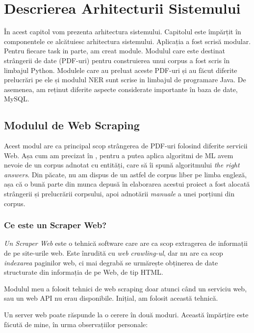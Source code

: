 \chapter{Descrierea Arhitecturii Sistemului}
\label{chapter:architecture}

În acest capitol vom prezenta arhitectura sistemului. Capitolul este împărțit în componentele ce alcătuiesc arhitectura sistemului. Aplicația a fost scrisă modular. Pentru fiecare task in parte, am creat module. Modulul care este destinat strângerii de date (PDF-uri) pentru construierea unui corpus a fost scris în limbajul Python. Modulele care au preluat aceste PDF-uri și au făcut diferite prelucrări pe ele și modulul NER sunt scrise in limbajul de programare Java. De asemenea, am reținut diferite aspecte considerate importante în baza de date, MySQL.


\section{Modulul de Web Scraping}
\label{sec:web-module}

Acest modul are ca principal scop strângerea de PDF-uri folosind diferite servicii Web. Așa cum am precizat în , pentru a putea aplica algoritmi de ML avem nevoie de un corpus adnotat cu entități, care să îi spună algoritmului \textit{the right answers}. Din păcate, nu am dispus de un astfel de corpus liber pe limba engleză, așa că o bună parte din munca depusă în elaborarea acestui proiect a fost alocată strângerii și prelucrării corpsului, apoi adnotării \textit{manuale} a unei porțiuni din corpus.


\subsection{Ce este un Scraper Web?}

\textit{Un Scraper Web} este o tehnică software care are ca scop extragerea de informații de pe site-urile web. Este înrudită cu \textit{web crawling-ul}, dar nu are ca scop \textit{indexarea} paginilor web, ci mai degrabă se urmărește obținerea de date structurate din informația de pe Web, de tip HTML.

Modulul meu a folosit tehnici de web scraping doar atunci când un serviciu web, sau un web API nu erau disponibile. Inițial, am folosit această tehnică.

Un server web poate răspunde la o cerere în două moduri. Această împărțire este făcută de mine, în urma observațiilor personale:

